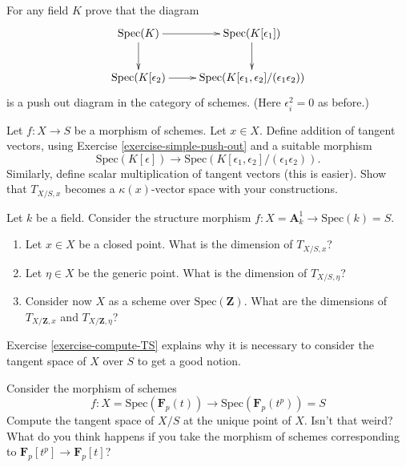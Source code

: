 \begin{exercise}
\label{exercise-simple-push-out}
For any field $K$ prove that the diagram
$$
\xymatrix{
\text{Spec}(K) \ar[r] \ar[d] & \text{Spec}(K[\epsilon_1]) \ar[d] \\
\text{Spec}(K[\epsilon_2) \ar[r] &
\text{Spec}(K[\epsilon_1, \epsilon_2]/(\epsilon_1\epsilon_2))
}
$$
is a push out diagram in the category of schemes.
(Here $\epsilon_i^2 = 0$ as before.)
\end{exercise}

\begin{exercise}
\label{exercise-tangent-space-vectors-space}
Let $f : X \to S$ be a morphism of schemes.
Let $x \in X$. Define addition of tangent vectors,
using Exercise \ref{exercise-simple-push-out}
and a suitable morphism
$$
\text{Spec}(K[\epsilon])
\longrightarrow
\text{Spec}(K[\epsilon_1, \epsilon_2]/(\epsilon_1\epsilon_2)).
$$
Similarly, define scalar multiplication of tangent vectors (this is easier).
Show that $T_{X/S, x}$ becomes a $\kappa(x)$-vector space with your
constructions.
\end{exercise}

\begin{exercise}
\label{exercise-compute-TS}
Let $k$ be a field. Consider
the structure morphism $f : X = \mathbf{A}^1_{k} \to \text{Spec}(k) = S$.
\begin{enumerate}
\item Let $x \in X$ be a closed point. What is the dimension of
$T_{X/S, x}$?
\item Let $\eta \in X$ be the generic point. What is the dimension
of $T_{X/S, \eta}$?
\item Consider now $X$ as a scheme over $\text{Spec}(\mathbf{Z})$.
What are the dimensions of $T_{X/\mathbf{Z}, x}$ and
$T_{X/\mathbf{Z}, \eta}$?
\end{enumerate}
\end{exercise}

\begin{remark}
\label{exercise-tangent-space-relative}
Exercise \ref{exercise-compute-TS} explains why it is necessary
to consider the tangent space of $X$ over $S$ to get a good notion.
\end{remark}

\begin{exercise}
\label{exercise-compute-TS-field}
Consider the morphism of schemes
$$
f : X = \text{Spec}(\mathbf{F}_p(t))
\longrightarrow
\text{Spec}(\mathbf{F}_p(t^p)) = S
$$
Compute the tangent space of $X/S$ at the unique point of $X$.
Isn't that weird? What do you think happens if you take the morphism
of schemes corresponding to $\mathbf{F}_p[t^p] \to \mathbf{F}_p[t]$?
\end{exercise}

